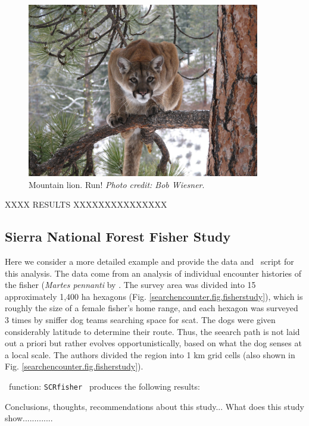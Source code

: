 \begin{figure}
\centering
\includegraphics[height=3in]{Ch15-searchencounter/figs/mountain_lion.jpg}
\caption{
Mountain lion.
Run!
{\it Photo credit: Bob Wiesner}.
}
\label{searchencounter.fig.lion}
\end{figure}

XXXX RESULTS XXXXXXXXXXXXXXX

\subsection{Sierra National Forest Fisher Study}

Here we consider a more detailed example and provide the data and
\R~script for this analysis.  The data come from an analysis of
individual encounter histories of the fisher ({\it Martes pennanti} by
\citet{thompson_etal:2012}.  The survey area was divided into 15
approximately 1,400 ha hexagons
(Fig. \ref{searchencounter.fig.fisherstudy}), which is roughly the
size of a female fisher's home range, and each hexagon was surveyed 3
times by sniffer dog teams searching space for scat. The dogs were
given considerably latitude to determine their route.  Thus, the
seearch path is not laid out a priori but rather evolves
opportunistically, based on what the dog senses at a local scale.  The
authors divided the region into 1 km grid cells (also shown in Fig.
\ref{searchencounter.fig.fisherstudy}).

\R~function: \mbox{\tt SCRfisher  } produces the following results:

Conclusions, thoughts, recommendations about this study...
What does this study show.............


